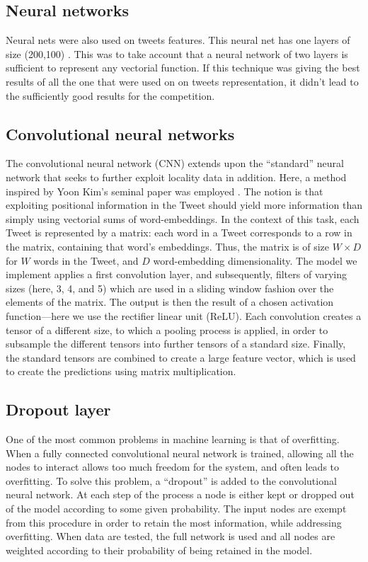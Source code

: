 \subsection{Neural networks}

Neural nets were also used on tweets features. This neural net has one layers of size (200,100) . This was to take account that a neural network of  two layers is sufficient to represent any vectorial function.  If this technique was giving the best results of all the one that were used on on tweets representation, it didn't lead to the sufficiently good results for the competition. 

\subsection{Convolutional neural networks}
The convolutional neural network (CNN) extends upon the ``standard'' neural network that seeks to further exploit locality data in addition. Here, a method inspired by Yoon Kim's seminal paper was employed \cite{cnnYoon}. The notion is that exploiting positional information in the Tweet should yield more information than simply using vectorial sums of word-embeddings.
In the context of this task, each Tweet is represented by a matrix: each word in a Tweet corresponds to a row in the matrix, containing that word's embeddings. Thus, the matrix is of size $W \times D$ for $W$ words in the Tweet, and $D$ word-embedding dimensionality.
The model we implement applies a first convolution layer, and subsequently, filters of varying sizes (here, 3, 4, and 5) which are used in a sliding window fashion over the elements of the matrix. The output is then the result of a chosen activation function---here we use the rectifier linear unit (ReLU). Each convolution creates a tensor of a different size, to which a pooling process is applied, in order to subsample the different tensors into further tensors of a standard size. Finally, the standard tensors are combined to create a large feature vector, which is used to create the predictions using matrix multiplication.

\subsection{Dropout layer}
One of the most common problems in machine learning is that of overfitting. When a fully connected convolutional neural network is trained, allowing all the nodes to interact allows too much freedom for the system, and often leads to overfitting. To solve this problem, a ``dropout'' is added to the convolutional neural network. At each step of the process a node is either kept or dropped out of the model according to some given probability. The input nodes are exempt from this procedure in order to retain the most information, while addressing overfitting. When data are tested, the full network is used and all nodes are weighted according to their probability of being retained in the model.


